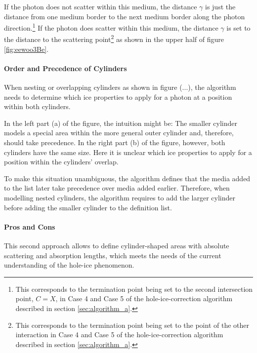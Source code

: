 If the photon does not scatter within this medium, the distance $\gamma$ is just the distance from one medium border to the next medium border along the photon direction.\footnote{This corresponds to the termination point being set to the second intersection point, $C = X$, in Case 4 and Case 5 of the hole-ice-correction algorithm described in section \ref{sec:algorithm_a}.}
If the photon does scatter within this medium, the distance $\gamma$ is set to the distance to the scattering point\footnote{This corresponds to the termination point being set to the point of the other interaction in Case 4 and Case 5 of the hole-ice-correction algorithm described in section \ref{sec:algorithm_a}.} as shown in the upper half of figure \ref{fig:eewoo3Be}.

\paragraph{Order and Precedence of Cylinders}
When nesting or overlapping cylinders as shown in figure (...), the algorithm needs to determine which ice properties to apply for a photon at a position within both cylinders.

In the left part (a) of the figure, the intuition might be: The smaller cylinder models a special area within the more general outer cylinder and, therefore, should take precedence. In the right part (b) of the figure, however, both cylinders have the same size. Here it is unclear which ice properties to apply for a position within the cylinders' overlap.

To make this situation unambiguous, the algorithm defines that the media added to the list later take precedence over media added earlier. Therefore, when modelling nested cylinders, the algorithm requires to add the larger cylinder before adding the smaller cylinder to the definition list.

\paragraph{Pros and Cons}
This second approach allows to define cylinder-shaped areas with absolute scattering and absorption lengths, which meets the needs of the current understanding of the hole-ice phenomenon.

